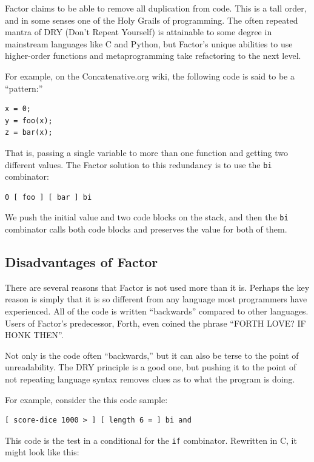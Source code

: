 \documentclass{article}
\begin{document}
Factor claims to be able to remove all duplication from code.  This is a tall
order, and in some senses one of the Holy Grails of programming.  The often
repeated mantra of DRY (Don't Repeat Yourself) is attainable to some degree in
mainstream languages like C and Python, but Factor's unique abilities to use
higher-order functions and metaprogramming take refactoring to the next level.

For example, on the Concatenative.org wiki, the following code
is said to be a ``pattern:''

\begin{verbatim}
x = 0;
y = foo(x);
z = bar(x);
\end{verbatim}

That is, passing a single variable to more than one function and getting two
different values.  The Factor solution to this redundancy is to use the
\texttt{bi} combinator:

\begin{verbatim}
0 [ foo ] [ bar ] bi
\end{verbatim}

We push the initial value and two code blocks on the stack, and then the
\texttt{bi} combinator calls both code blocks and preserves the value for both
of them.

\subsection{Disadvantages of Factor}

There are several reasons that Factor is not used more than it is.  Perhaps the
key reason is simply that it is so different from any language most programmers
have experienced.  All of the code is written ``backwards'' compared to other
languages.  Users of Factor's predecessor, Forth, even coined the phrase ``FORTH
LOVE? IF HONK THEN''.

Not only is the code often ``backwards,'' but it can also be terse to the point
of unreadability.  The DRY principle is a good one, but pushing it to the point
of not repeating language syntax removes clues as to what the program is doing.

For example, consider the this code sample:

\begin{verbatim}
[ score-dice 1000 > ] [ length 6 = ] bi and
\end{verbatim}

This code is the test in a conditional for the \texttt{if} combinator.
Rewritten in C, it might look like this:
\end{document}
